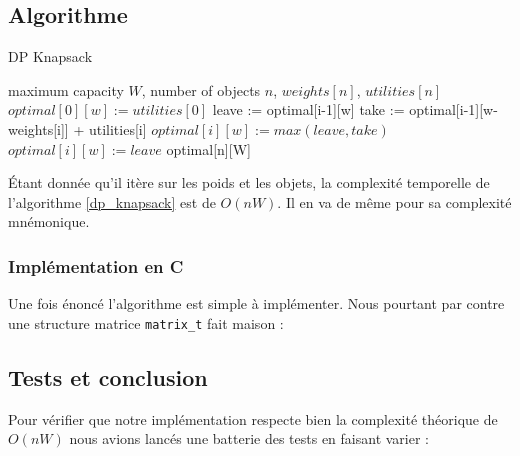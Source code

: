 \subsection{Algorithme}

\begin{algorithm}[!ht]
\caption{DP Knapsack}
\label{dp_knapsack}
\begin{algorithmic}[1]
\REQUIRE maximum capacity $W$, number of objects $n$, $weights[n]$, $utilities[n]$  
		\STATE $optimal[0][w] := utilities[0]$
	\ENDIF
\ENDFOR
{}
		\STATE leave := optimal[i-1][w]
		\STATE take := optimal[i-1][w-weights[i]] + utilities[i]
			\STATE $optimal[i][w] := max(leave, take)$
		\ELSE
			\STATE $optimal[i][w] := leave$
		\ENDIF
	\ENDFOR
\ENDFOR
\RETURN optimal[n][W]
\end{algorithmic}
\end{algorithm}

Étant donnée qu'il itère sur les poids et les objets, la complexité temporelle de l'algorithme \ref{dp_knapsack} est de $O(nW)$. Il en va de même pour sa complexité mnémonique.

\subsubsection{Implémentation en C}
Une fois énoncé l'algorithme est simple à implémenter. Nous pourtant par contre une structure matrice \texttt{matrix\_t} fait maison : 

 


\subsection{Tests et conclusion}

Pour vérifier que notre implémentation respecte bien la complexité théorique de $O(nW)$ nous avions lancés une batterie des tests en faisant varier : 

